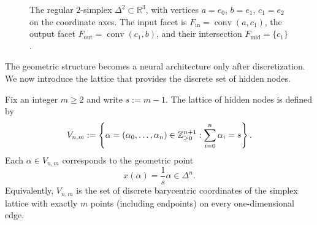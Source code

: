 \begin{figure}[ht]
\centering
{}
\caption{The regular $2$-simplex $\Delta^2 \subset \mathbb{R}^3$, with vertices
  $a=e_0$, $b=e_1$, $c_1=e_2$ on the coordinate axes.
  The input facet is $F_{\mathrm{in}}=\operatorname{conv}(a,c_1)$,
  the output facet $F_{\mathrm{out}}=\operatorname{conv}(c_1,b)$,
  and their intersection $F_{\mathrm{mid}}=\{c_1\}$.}
\label{fig:simplex-geometry}
\end{figure}

The geometric structure becomes a neural architecture only after discretization. We now introduce the lattice that provides the discrete set of hidden nodes.

\begin{definition}
Fix an integer $m\geq 2$ and write $s := m-1$. The lattice of hidden nodes is defined by
\[
V_{n,m}
:=
\left\{\alpha=(\alpha_0,\dots,\alpha_n)\in \mathbb{Z}_{\geq 0}^{n+1}: \sum_{i=0}^n \alpha_i = s\right\}.
\]
Each $\alpha\in V_{n,m}$ corresponds to the geometric point
\[
x(\alpha)=\frac{1}{s}\alpha \in \Delta^n.
\]
Equivalently, $V_{n,m}$ is the set of discrete barycentric coordinates of the simplex lattice with exactly $m$ points (including endpoints) on every one-dimensional edge.
\end{definition}

